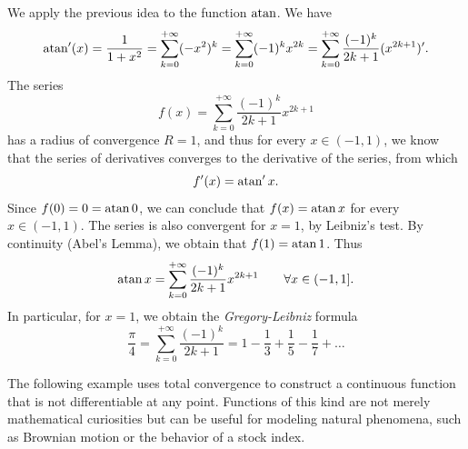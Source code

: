 \begin{example}
We apply the previous idea to the function $\operatorname{atan}$. We have
\[
  \operatorname{atan}'(x) = \frac{1}{1+x^2} = \sum_{k=0}^{+\infty} (-x^2)^k
  = \sum_{k=0}^{+\infty} (-1)^k x^{2k}
  = \sum_{k=0}^{+\infty} \frac{(-1)^k}{2k+1}(x^{2k+1})'.
\]
The series
\[
 f(x) = \sum_{k=0}^{+\infty}\frac{(-1)^k}{2k+1} x^{2k+1}
\]
has a radius of convergence $R=1$, and thus for every $x\in(-1,1)$, we know that
the series of derivatives converges to the derivative of the series, from which
\[
  f'(x) = \operatorname{atan}' x.
\]
Since $f(0) = 0 = \operatorname{atan} 0$, we can conclude that $f(x) =\operatorname{atan} x$ for every
$x\in (-1,1)$. The series is also convergent for $x=1$, by Leibniz's test. By
continuity (Abel's Lemma), we obtain that $f(1) = \operatorname{atan} 1$. Thus
\[
  \operatorname{atan} x = \sum_{k=0}^{+\infty}\frac{(-1)^k}{2k+1}x^{2k+1}
  \qquad \forall x \in (-1,1].
\]
In particular, for $x=1$, we obtain the \emph{Gregory-Leibniz} formula%
\[
  \frac{\pi}{4} = \sum_{k=0}^{+\infty} \frac{(-1)^k}{2k+1} =
   1 - \frac{1}{3} + \frac{1}{5} - \frac{1}{7} + \dots
\]
\end{example}

The following example uses total convergence to construct a continuous function
that is not differentiable at any point. Functions of this kind are not merely
mathematical curiosities but can be useful for modeling natural phenomena, such
as Brownian motion or the behavior of a stock index.

